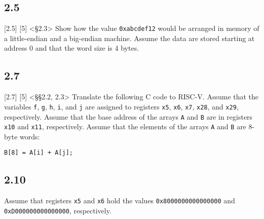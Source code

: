 \documentclass[11pt]{article}
\begin{document}
\subsection*{2.5}
[2.5] [5] <§2.3> Show how the value \texttt{0xabcdef12} would be arranged in memory 
of a little-endian and a big-endian machine. Assume the data are stored starting at 
address 0 and that the word size is 4 bytes.

\subsection*{2.7}
[2.7] [5] <§§2.2, 2.3> Translate the following C code to RISC-V. Assume that the 
variables \texttt{f}, \texttt{g}, \texttt{h}, \texttt{i}, and \texttt{j} are assigned to registers \texttt{x5}, \texttt{x6}, \texttt{x7}, \texttt{x28}, and \texttt{x29}, 
respectively. Assume that the base address of the arrays \texttt{A} and \texttt{B} are in registers \texttt{x10}
and \texttt{x11}, respectively. Assume that the elements of the arrays \texttt{A} and \texttt{B} are 8-byte 
words:
\begin{verbatim}
B[8] = A[i] + A[j];
\end{verbatim}

\subsection*{2.10}
Assume that registers \texttt{x5} and \texttt{x6} hold the values \texttt{0x8000000000000000}
and \texttt{0xD000000000000000}, respectively.
\end{document}
